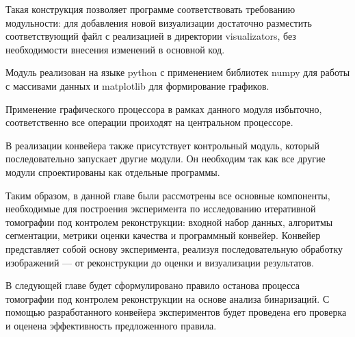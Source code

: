 Такая конструкция позволяет программе соответствовать требованию модульности: для добавления новой визуализации достаточно разместить соответствующий файл с реализацией в директории visualizators, без необходимости внесения изменений в основной код.

Модуль реализован на языке python с применением библиотек numpy для работы с массивами данных и matplotlib для формирование графиков.

Применение графического процессора в рамках данного модуля избыточно, соответственно все операции проиходят на центральном процессоре.

В реализации конвейера также присутствует контрольный модуль, который последовательно запускает другие модули. Он необходим так как все другие модули спроектированы как отдельные программы.

Таким образом, в данной главе были рассмотрены все основные компоненты, необходимые для построения эксперимента по исследованию итеративной томографии под контролем реконструкции: входной набор данных, алгоритмы сегментации, метрики оценки качества и программный конвейер. Конвейер представляет собой основу эксперимента, реализуя последовательную обработку изображений — от реконструкции до оценки и визуализации результатов. 

В следующей главе будет сформулировано правило останова процесса томографии под контролем реконструкции на основе анализа бинаризаций. С помощью разработанного конвейера экспериментов будет проведена его проверка и оценена эффективность предложенного правила.